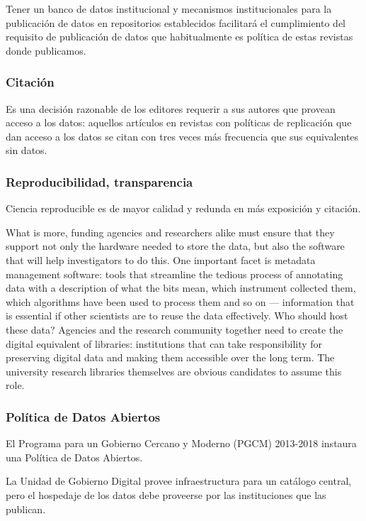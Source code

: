 \documentclass[
10pt, %
letterpaper, %
oneside, %
headinclude,footinclude, %
BCOR5mm, %
]{scrartcl}
\begin{document}
Tener un banco de datos institucional y mecanismos institucionales
para la publicación de datos en repositorios establecidos facilitará
el cumplimiento del requisito de publicación de datos que
habitualmente es política de estas revistas donde publicamos.


\subsubsection{Citación}
Es una decisión razonable de los editores requerir a sus autores
que provean acceso a los datos: aquellos artículos en revistas con
políticas de replicación que dan acceso a los datos se citan con tres
veces más frecuencia que sus equivalentes sin datos.\cite{walport_sharing_2011}


\subsubsection{Reproducibilidad, transparencia}
Ciencia reproducible es de mayor calidad y redunda en más exposición y
citación. \cite{piwowar_sharing_2007} \cite{ioannidis}



What is more, funding agencies and researchers alike must ensure that
they support not only the hardware needed to store the data, but also
the software that will help investigators to do this. One important
facet is metadata management software: tools that streamline the
tedious process of annotating data with a description of what the bits
mean, which instrument collected them, which algorithms have been used
to process them and so on — information that is essential if other
scientists are to reuse the data effectively. Who should host these
data? Agencies and the research community together need to create the
digital equivalent of libraries: institutions that can take
responsibility for preserving digital data and making them accessible
over the long term. The university research libraries themselves are
obvious candidates to assume this role.

\subsubsection{Política de Datos Abiertos}
El Programa para un Gobierno Cercano y Moderno (PGCM) 2013-2018
instaura una Política de Datos Abiertos.

La Unidad de Gobierno Digital provee infraestructura para un catálogo
central, pero el hospedaje de los datos debe proveerse por las
instituciones que las publican.
\end{document}
